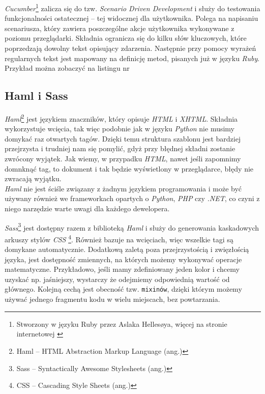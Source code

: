 \documentclass[a4paper,12pt]{article}
\begin{document}
\emph{Cucumber}\footnote{Stworzony w języku Ruby przez Aslaka Hellesøya, więcej na stronie
internetowej \cite{cucumber}} zalicza się do tzw. \emph{Scenario Driven Development} i
służy do testowania funkcjonalności ostatecznej -- tej widocznej dla użytkownika. Polega
na napisaniu scenariusza, który zawiera poszczególne akcje użytkownika wykonywane z
poziomu przeglądarki. Składnia ogranicza się do kilku słów kluczowych, które poprzedzają
dowolny tekst opisujący zdarzenia. Następnie przy pomocy wyrażeń regularnych tekst jest
mapowany na definicję metod, pisanych już w języku \emph {Ruby}. Przykład można zobaczyć
na listingu nr


\subsection{Haml i Sass}
\emph{Haml}\footnote{Haml -- HTML Abstraction Markup Language (ang.)} jest językiem
znaczników, który opisuje \emph{HTML} i \emph{XHTML}. Składnia wykorzystuje wcięcia, tak więc podobnie
jak w języku \emph{Python} nie musimy domykać raz otwartych tagów. Dzięki temu struktura
szablonu jest bardziej przejrzysta i trudniej nam się pomylić, gdyż przy błędnej składni
zostanie zwrócony wyjątek. Jak wiemy, w przypadku \emph{HTML}, nawet jeśli zapomnimy
domnknąć tag, to dokument i tak będzie wyświetlony w przeglądarce, błędy nie zwracają
wyjątku.\\
\emph{Haml} nie jest ściśle związany z żadnym językiem programowania i może być używany
również we frameworkach opartych o \emph{Python}, \emph{PHP} czy \emph{.NET}, co czyni
z niego narzędzie warte uwagi dla każdego dewelopera.


\emph{Sass}\footnote{Sass -- Syntactically Awesome Stylesheets (ang.)} jest dostępny razem
z biblioteką \emph{Haml} i służy do generowania kaskadowych arkuszy stylów \emph{CSS
}\footnote{CSS -- Cascading Style Sheets (ang.)}. Również bazuje na wcięciach, więc
wszelkie tagi są domykane automatycznie. Dodatkową zaletą poza przejrzystością i
zwięzłością języka, jest dostępność zmiennych, na których możemy wykonywać operacje
matematyczne. Przykładowo, jeśli mamy zdefiniowany jeden kolor i chcemy uzyskać np.
jaśniejszy, wystarczy że odejmiemy odpowiednią wartość od głównego. Kolejną cechą jest
obecność tzw. \texttt{mixinów}, dzięki którym możemy używać jednego fragmentu kodu w wielu
miejscach, bez powtarzania.
\end{document}
